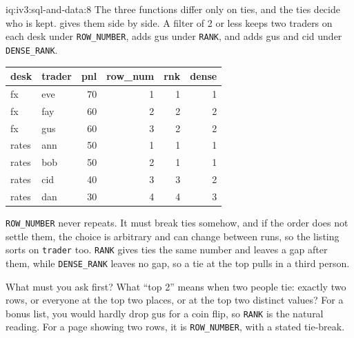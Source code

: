 \begin{solution}{iq:iv3:sql-and-data:8}
The three functions differ only on ties, and the ties decide who is kept.  gives them side by side. A filter of 2 or less keeps two traders on each desk under \texttt{ROW\_NUMBER}, adds gus under \texttt{RANK}, and adds gus and cid under \texttt{DENSE\_RANK}.
\label{lst:iv3:sq:ranks}
\begin{center}\small
\begin{tabular}{llrrrr}
desk & trader & pnl & row\_num & rnk & dense\\\hline
fx & eve & 70 & 1 & 1 & 1\\
fx & fay & 60 & 2 & 2 & 2\\
fx & gus & 60 & 3 & 2 & 2\\
rates & ann & 50 & 1 & 1 & 1\\
rates & bob & 50 & 2 & 1 & 1\\
rates & cid & 40 & 3 & 3 & 2\\
rates & dan & 30 & 4 & 4 & 3
\end{tabular}
\end{center}
\texttt{ROW\_NUMBER} never repeats. It must break ties somehow, and if the order does not settle them, the choice is arbitrary and can change between runs, so the listing sorts on \texttt{trader} too. \texttt{RANK} gives ties the same number and leaves a gap after them, while \texttt{DENSE\_RANK} leaves no gap, so a tie at the top pulls in a third person.

What must you ask first? What ``top 2'' means when two people tie: exactly two rows, or everyone at the top two places, or at the top two distinct values? For a bonus list, you would hardly drop gus for a coin flip, so \texttt{RANK} is the natural reading. For a page showing two rows, it is \texttt{ROW\_NUMBER}, with a stated tie-break.

\end{solution}

